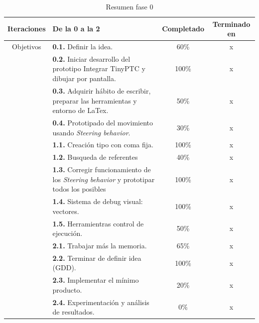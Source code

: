 \begin{table}[htb]
\begin{center}
\begin{tabular}{|c|p{7cm}|c|c|}

\hline
Iteraciones & De la 0 a la 2                                                & Completado    & Terminado en \\ 
\hline
Objetivos   &   \textbf{0.1.} Definir la idea.                              & 60\%          & x         \\
		    &   \textbf{0.2.} Iniciar desarrollo del prototipo
		    					Integrar TinyPTC y dibujar por pantalla.    & 100\%         & x         \\
		    &	\textbf{0.3.} Adquirir hábito de escribir, preparar
		    					las herramientas y entorno de LaTex.        & 50\%          & x         \\
		    &	\textbf{0.4.} Prototipado del movimiento usando 
		    					\textit{Steering behavior}.                 & 30\%          & x         \\
	\cmidrule{2-2}
			&	\textbf{1.1.} Creación tipo con coma fija.                  & 100\%         & x         \\
		    &	\textbf{1.2.} Busqueda de referentes                        & 40\%          & x         \\
		    &	\textbf{1.3.} Corregir funcionamiento de los
		    					\textit{Steering behavior} y
		    					prototipar todos los posibles               & 100\%         & x         \\
		    &	\textbf{1.4.} Sistema de debug visual: vectores.            & 100\%         & x         \\ 
			&	\textbf{1.5.} Herramientras control de ejecución.           & 50\%          & x         \\ 
	\cmidrule{2-2}
		    &	\textbf{2.1.} Trabajar más la memoria.                      & 65\%          & x         \\
		    &	\textbf{2.2.} Terminar de definir idea (GDD).               & 100\%         & x         \\
		    &	\textbf{2.3.} Implementar el mínimo producto.               & 20\%          & x         \\
		    &	\textbf{2.4.} Experimentación y análisis de resultados.     & 0\%           & x         \\
\hline
\end{tabular}
\caption{Resumen fase 0}
\end{center}
\end{table}

